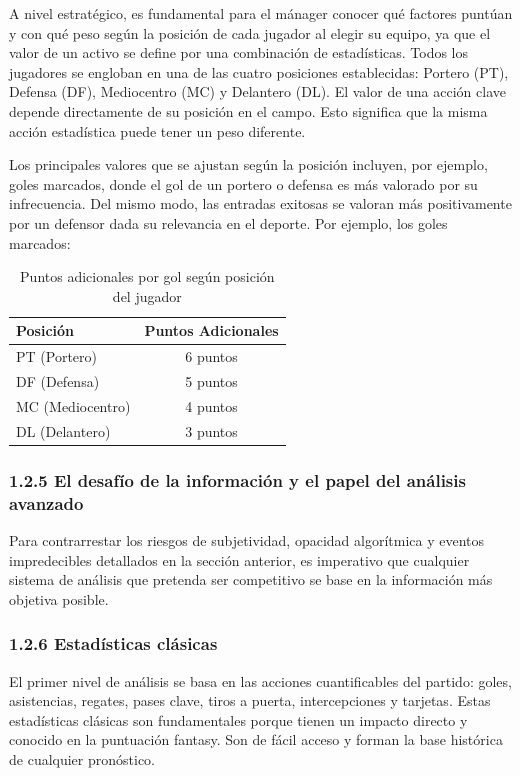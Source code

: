 A nivel estratégico, es fundamental para el mánager conocer qué factores puntúan y con qué peso 
según la posición de cada jugador al elegir su equipo, ya que el valor de un activo se define por 
una combinación de estadísticas.
Todos los jugadores se engloban en una de las cuatro posiciones establecidas: Portero (PT), Defensa 
(DF), Mediocentro (MC) y Delantero (DL).
El valor de una acción clave depende directamente de su posición en el campo.
Esto significa que la misma acción estadística puede tener un peso diferente.

Los principales valores que se ajustan según la posición incluyen, por ejemplo, goles marcados, donde 
el gol de un portero o defensa es más valorado por su infrecuencia.
Del mismo modo, las entradas exitosas se valoran más positivamente por un defensor dada su relevancia 
en el deporte.
Por ejemplo, los goles marcados:

\begin{table}[h]
\centering
\begin{tabular}{lc}
\toprule
\textbf{Posición} & \textbf{Puntos Adicionales} \\
\midrule
PT (Portero) & 6 puntos \\
DF (Defensa) & 5 puntos \\
MC (Mediocentro) & 4 puntos \\
DL (Delantero) & 3 puntos \\
\bottomrule
\end{tabular}
\caption{Puntos adicionales por gol según posición del jugador}\label{tab:goles_posicion}
\end{table}

\subsubsection{1.2.5 El desafío de la información y el papel del análisis avanzado}

Para contrarrestar los riesgos de subjetividad, opacidad algorítmica y eventos impredecibles detallados 
en la sección anterior, es imperativo que cualquier sistema de análisis que pretenda ser competitivo se 
base en la información más objetiva posible.

\subsubsection{1.2.6 Estadísticas clásicas}

El primer nivel de análisis se basa en las acciones cuantificables del partido: goles, asistencias, 
regates, pases clave, tiros a puerta, intercepciones y tarjetas.
Estas estadísticas clásicas son fundamentales porque tienen un impacto directo y conocido en la 
puntuación fantasy.
Son de fácil acceso y forman la base histórica de cualquier pronóstico.

